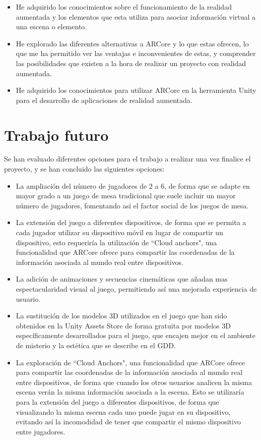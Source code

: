 \begin{itemize}
  \item He adquirido los conocimientos sobre el funcionamiento de la realidad aumentada y los elementos que esta utiliza para asociar información virtual a una escena o elemento.

  \item He explorado las diferentes alternativas a ARCore y lo que estas ofrecen, lo que me ha permitido ver las ventajas e inconvenientes de estas, y comprender las posibilidades que existen a la hora de realizar un proyecto con realidad aumentada.

  \item He adquirido los conocimientos para utilizar ARCore en la herramienta Unity para el desarrollo de aplicaciones de realidad aumentada.

\end{itemize}

\section{Trabajo futuro}
Se han evaluado diferentes opciones para el trabajo a realizar una vez finalice el proyecto, y se han concluido las siguientes opciones:

\begin{itemize}
  \item La ampliación del número de jugadores de 2 a 6, de forma que se adapte en mayor grado a un juego de mesa tradicional que suele incluir un mayor número de jugadores, fomentando así el factor social de los juegos de mesa.

  \item La extensión del juego a diferentes dispositivos, de forma que se permita a cada jugador utilizar su dispositivo móvil en lugar de compartir un dispositivo, esto requeriría la utilización de ``Cloud anchors", una funcionalidad que ARCore ofrece para compartir las coordenadas de la información asociada al mundo real entre dispositivos.

  \item La adición de animaciones y secuencias cinemáticas que añadan mas espectacularidad visual al juego, permitiendo así una mejorada experiencia de usuario.

  \item La sustitución de los modelos 3D utilizados en el juego que han sido obtenidos en la Unity Assets Store de forma gratuita por modelos 3D específicamente desarrollados para el juego, que encajen mejor en el ambiente de misterio y la estética que se describe en el GDD.

  \item La exploración de ``Cloud Anchors", una funcionalidad que ARCore ofrece para compartir las coordenadas de la información asociada al mundo real entre dispositivos, de forma que cuando los otros usuarios analicen la misma escena verán la misma información asociada a la escena. Esto se utilizaría para la extensión del juego a diferentes dispositivos, de forma que visualizando la misma escena cada uno puede jugar en su dispositivo, evitando así la incomodidad de tener que compartir el mismo dispositivo entre jugadores.

\end{itemize}

